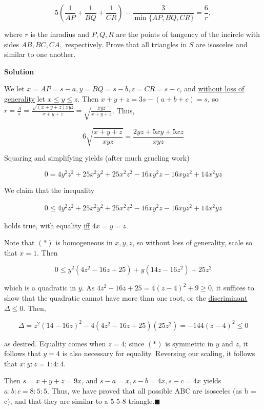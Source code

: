 \begin{enumerate}
 
 \[5 \left( \dfrac{1}{AP} + \dfrac{1}{BQ} + \dfrac{1}{CR} \right) - \dfrac{3}{\min\{ AP, BQ, CR \}} = \dfrac{6}{r},\]


 where $r$ is the inradius and $P, Q, R$ are the points of tangency of the incircle with sides $AB, BC, CA,$ respectively. Prove that all triangles in $S$ are isosceles  and similar to one another.


 



\textbf{Solution}

We let $x = AP = s - a, y = BQ = s-b, z = CR = s-c$, and \href{https://artofproblemsolving.com/wiki/index.php?title=Without\_loss\_of\_generality}{without loss of generality} let $x \le y \le z$. Then $x + y + z = 3s - (a+b+c) = s$, so $r = \frac {A}{s} = \frac{\sqrt{(x+y+z)xyz}}{x+y+z} = \sqrt{\frac{xyz}{x+y+z}}$. Thus, 

 
 \[6\sqrt{\frac{x+y+z}{xyz}} = \frac{2yz + 5xy + 5xz}{xyz}\] 

 Squaring and simplifying yields (after much grueling work)

 
 \[0 = 4y^2z^2 + 25x^2y^2 + 25x^2z^2 - 16xy^2z - 16xyz^2 + 14x^2yz\]

 We claim that the inequality 

 
 \begin{align}0 \le 4y^2z^2 + 25x^2y^2 + 25x^2z^2 - 16xy^2z - 16xyz^2 + 14x^2yz \tag{*} \end{align}

 holds true, with equality \href{https://artofproblemsolving.com/wiki/index.php?title=Iff}{iff} $4x = y = z$.

 
Note that $(*)$ is homogeneous in $x,y,z$, so without loss of generality, scale so that $x=1$. Then 

 
 \[0 \le y^2 (4z^2 - 16z + 25) + y(14z - 16z^2) + 25z^2\]

 which is a quadratic in $y$. As $4z^2 - 16z + 25 = 4(z-4)^2 + 9 \ge 0$, it suffices to show that the quadratic cannot have more than one root, or the \href{https://artofproblemsolving.com/wiki/index.php?title=Discriminant}{discriminant} $\Delta \le 0$. Then,

 
 \[\Delta = z^2(14-16z)^2 - 4(4z^2 - 16z + 25)(25z^2) = -144(z-4)^2 \le 0\]

 as desired. Equality comes when $z = 4$; since $(*)$ is symmetric in $y$ and $z$, it follows that $y = 4$ is also necessary for equality. Reversing our scaling, it follows that $x:y:z = 1:4:4$.

 Then $s = x+y+z = 9x$, and $s-a = x, s-b = 4x, s-c = 4x$ yields $a:b:c = 8:5:5$. Thus, we have proved that all possible ABC are isosceles (as b = c), and that they are similar to a 5-5-8 triangle.$\blacksquare$





\end{enumerate}
